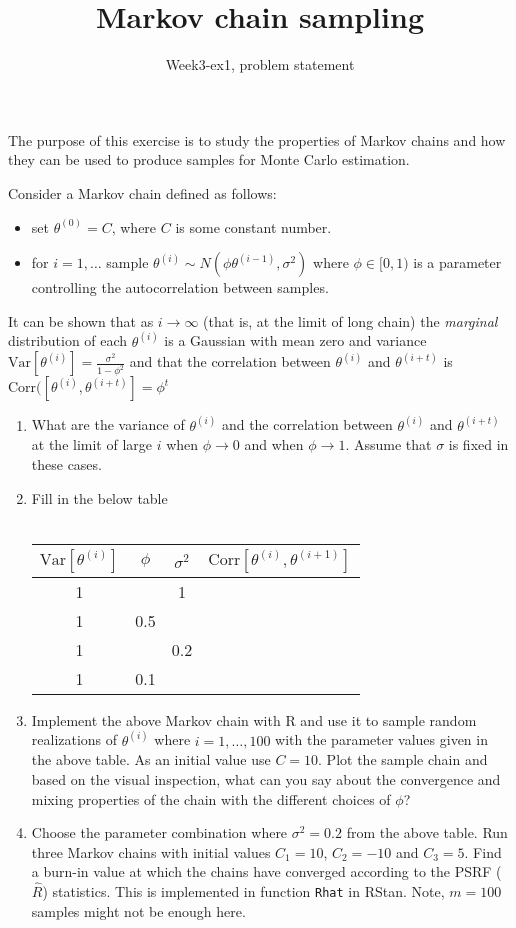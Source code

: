\documentclass[
]{article}
\title{Markov chain sampling}
\subtitle{Week3-ex1, problem statement}
\author{}
\date{\vspace{-2.5em}}
\begin{document}
\maketitle

The purpose of this exercise is to study the properties of Markov chains
and how they can be used to produce samples for Monte Carlo estimation.

Consider a Markov chain defined as follows:

\begin{itemize}
\item set $\theta^{(0)} = C$, where $C$ is some constant number.
\item for $i=1,\dots$ sample $\theta^{(i)} \sim N(\phi \theta^{(i-1)},\sigma^2)$ where $\phi\in[0,1)$ is a parameter controlling the autocorrelation between samples.
\end{itemize}

It can be shown that as \(i \rightarrow \infty\) (that is, at the limit
of long chain) the \emph{marginal} distribution of each \(\theta^{(i)}\)
is a Gaussian with mean zero and variance
\(\text{Var}[\theta^{(i)}] = \frac{\sigma^2}{1-\phi^2}\) and that the
correlation between \(\theta^{(i)}\) and \(\theta^{(i+t)}\) is
\(\text{Corr}([\theta^{(i)},\theta^{(i+t)}] = \phi^t\)

\begin{enumerate}
\item What are the variance of $\theta^{(i)}$ and the correlation between $\theta^{(i)}$ and $\theta^{(i+t)}$ at the limit of large $i$ when $\phi \rightarrow 0$ and when $\phi \rightarrow 1$. Assume that $\sigma$ is fixed in these cases.
\item Fill in the below table\\ \\
\begin{tabular}{c|c|c|c}
$\text{Var}[\theta^{(i)}]$ & $\phi$ & $\sigma^2$ & $\text{Corr}[\theta^{(i)},\theta^{(i+1)}]$\\
\hline
1 &     &  1   &  \\ 
1 & 0.5 &      &   \\
1 &     &  0.2 & \\
1 & 0.1 &   & \\
\end{tabular}
\item Implement the above Markov chain with R and use it to sample random realizations of $\theta^{(i)}$ where $i=1,\dots,100$ with the parameter values given in the above table. As an initial value use $C=10$. Plot the sample chain and based on the visual inspection, what can you say about the convergence and mixing properties of the chain with the different choices of $\phi$?
\item Choose the parameter combination where $\sigma^2=0.2$ from the above table. Run three Markov chains with initial values $C_1 = 10$, $C_2=-10$ and $C_3=5$. Find a burn-in value at which the chains have converged according to the PSRF ($\hat{R}$) statistics. This is implemented in function \texttt{Rhat} in RStan. Note, $m=100$ samples might not be enough here.
\end{enumerate}
\end{document}
